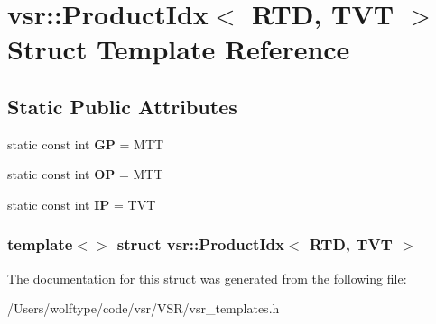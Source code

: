 \hypertarget{structvsr_1_1_product_idx_3_01_r_t_d_00_01_t_v_t_01_4}{\section{vsr\-:\-:Product\-Idx$<$ R\-T\-D, T\-V\-T $>$ Struct Template Reference}
\label{structvsr_1_1_product_idx_3_01_r_t_d_00_01_t_v_t_01_4}
}
\subsection*{Static Public Attributes}
\begin{DoxyCompactItemize}
\item 
\hypertarget{structvsr_1_1_product_idx_3_01_r_t_d_00_01_t_v_t_01_4_ae1d70b6a6adde73517bb4a3554c2f408}{static const int {\bfseries G\-P} = M\-T\-T}\label{structvsr_1_1_product_idx_3_01_r_t_d_00_01_t_v_t_01_4_ae1d70b6a6adde73517bb4a3554c2f408}

\item 
\hypertarget{structvsr_1_1_product_idx_3_01_r_t_d_00_01_t_v_t_01_4_af1a78d5c324e4b77daaa4b34d614342d}{static const int {\bfseries O\-P} = M\-T\-T}\label{structvsr_1_1_product_idx_3_01_r_t_d_00_01_t_v_t_01_4_af1a78d5c324e4b77daaa4b34d614342d}

\item 
\hypertarget{structvsr_1_1_product_idx_3_01_r_t_d_00_01_t_v_t_01_4_a317e98792be92fd0b2e7404ace848037}{static const int {\bfseries I\-P} = T\-V\-T}\label{structvsr_1_1_product_idx_3_01_r_t_d_00_01_t_v_t_01_4_a317e98792be92fd0b2e7404ace848037}

\end{DoxyCompactItemize}
\subsubsection*{template$<$$>$ struct vsr\-::\-Product\-Idx$<$ R\-T\-D, T\-V\-T $>$}



The documentation for this struct was generated from the following file\-:\begin{DoxyCompactItemize}
\item 
/\-Users/wolftype/code/vsr/\-V\-S\-R/vsr\-\_\-templates.\-h\end{DoxyCompactItemize}
